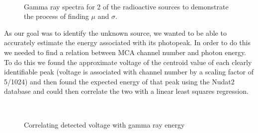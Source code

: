 \documentclass[11pt]{article}
\numberwithin{equation}{section}
\numberwithin{figure}{section}
\numberwithin{table}{section}
\begin{document}
    \begin{figure}[H]%
        \centering
        \,
        \caption{Gamma ray spectra for 2 of the radioactive sources to demonstrate the process of finding $\mu$ and $\sigma$.}
        \label{fig:Cs and Na spectra}
    \end{figure}

    \par As our goal was to identify the unknown source, we wanted to be able to accurately estimate the energy associated with its photopeak. In order to do this we needed to find a relation between MCA channel number and photon energy. To do this we found the approximate voltage of the centroid value of each clearly identifiable peak (voltage is associated with channel number by a scaling factor of 5/1024) and then found the expected energy of that peak using the Nudat2 database \cite{nudat} and could then correlate the two with a linear least squares regression. 

    \begin{figure}[H]%
        \centering
        \,
        \caption{Correlating detected voltage with gamma ray energy}
        \label{fig:linear regression}
    \end{figure}
\end{document}
